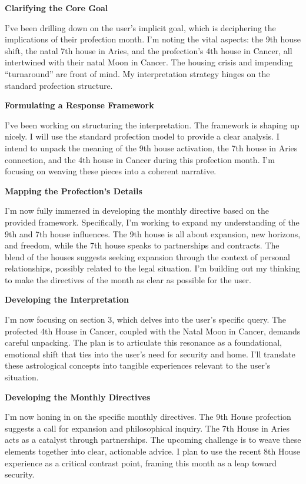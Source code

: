 \documentclass{article}
\begin{document}
\textbf{Clarifying the Core Goal}

I've been drilling down on the user's implicit goal, which is deciphering the implications of their profection month. I'm noting the vital aspects: the 9th house shift, the natal 7th house in Aries, and the profection's 4th house in Cancer, all intertwined with their natal Moon in Cancer. The housing crisis and impending ``turnaround'' are front of mind. My interpretation strategy hinges on the standard profection structure.

\textbf{Formulating a Response Framework}

I've been working on structuring the interpretation. The framework is shaping up nicely. I will use the standard profection model to provide a clear analysis. I intend to unpack the meaning of the 9th house activation, the 7th house in Aries connection, and the 4th house in Cancer during this profection month. I'm focusing on weaving these pieces into a coherent narrative.

\textbf{Mapping the Profection's Details}

I'm now fully immersed in developing the monthly directive based on the provided framework. Specifically, I'm working to expand my understanding of the 9th and 7th house influences. The 9th house is all about expansion, new horizons, and freedom, while the 7th house speaks to partnerships and contracts. The blend of the houses suggests seeking expansion through the context of personal relationships, possibly related to the legal situation. I'm building out my thinking to make the directives of the month as clear as possible for the user.

\textbf{Developing the Interpretation}

I'm now focusing on section 3, which delves into the user's specific query. The profected 4th House in Cancer, coupled with the Natal Moon in Cancer, demands careful unpacking. The plan is to articulate this resonance as a foundational, emotional shift that ties into the user's need for security and home. I'll translate these astrological concepts into tangible experiences relevant to the user's situation.

\textbf{Developing the Monthly Directives}

I'm now honing in on the specific monthly directives. The 9th House profection suggests a call for expansion and philosophical inquiry. The 7th House in Aries acts as a catalyst through partnerships. The upcoming challenge is to weave these elements together into clear, actionable advice. I plan to use the recent 8th House experience as a critical contrast point, framing this month as a leap toward security.
\end{document}
